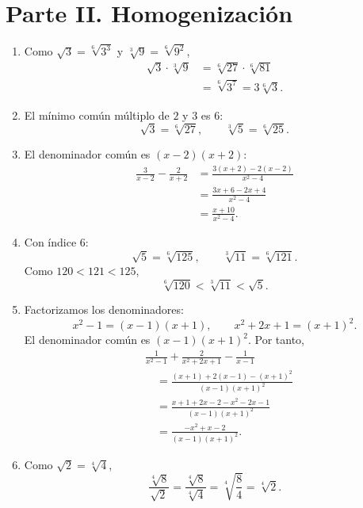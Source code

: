 \documentclass[12pt,a4paper]{article}
\begin{document}
\section*{Parte II. Homogenización}
\begin{enumerate}
  \item Como
    $\sqrt{3}=\sqrt[6]{3^3}$ y $\sqrt[3]{9}=\sqrt[6]{9^2}$,
    \begin{align*}
      \sqrt{3}\cdot\sqrt[3]{9}
      &=\sqrt[6]{27}\cdot\sqrt[6]{81}\\
      &=\sqrt[6]{3^7}=\boxed{3\sqrt[6]{3}}.
    \end{align*}

  \item El mínimo común múltiplo de $2$ y $3$ es $6$:
    \[
      \sqrt{3}=\boxed{\sqrt[6]{27}},
      \qquad \sqrt[3]{5}=\boxed{\sqrt[6]{25}}.
    \]

  \item El denominador común es $(x-2)(x+2)$:
    \begin{align*}
      \frac{3}{x-2}-\frac{2}{x+2}
      &=\frac{3(x+2)-2(x-2)}{x^2-4}\\
      &=\frac{3x+6-2x+4}{x^2-4}\\
      &=\boxed{\frac{x+10}{x^2-4}}.
    \end{align*}

  \item Con índice $6$:
    \[
      \sqrt{5}=\sqrt[6]{125},
      \qquad \sqrt[3]{11}=\sqrt[6]{121}.
    \]
    Como $120<121<125$,
    \[
      \boxed{\sqrt[6]{120}<\sqrt[3]{11}<\sqrt{5}}.
    \]

  \item Factorizamos los denominadores:
    \[
      x^2-1=(x-1)(x+1),
      \qquad x^2+2x+1=(x+1)^2.
    \]
    El denominador común es $(x-1)(x+1)^2$. Por tanto,
    \begin{align*}
      &\frac{1}{x^2-1}+\frac{2}{x^2+2x+1}-\frac{1}{x-1}\\
      &\quad=\frac{(x+1)+2(x-1)-(x+1)^2}{(x-1)(x+1)^2}\\
      &\quad=\frac{x+1+2x-2-x^2-2x-1}{(x-1)(x+1)^2}\\
      &\quad=\boxed{\frac{-x^2+x-2}{(x-1)(x+1)^2}}.
    \end{align*}

  \item Como $\sqrt{2}=\sqrt[4]{4}$,
    \[
      \frac{\sqrt[4]{8}}{\sqrt{2}}
      =\frac{\sqrt[4]{8}}{\sqrt[4]{4}}
      =\sqrt[4]{\frac{8}{4}}
      =\boxed{\sqrt[4]{2}}.
    \]
\end{enumerate}
\end{document}
